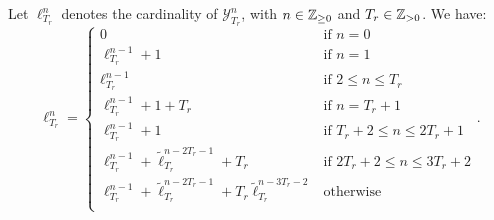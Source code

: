 \documentclass{article}
\begin{document}

      \begin{theorem} \label{thm:2-recursion}
        Let $\ell_{T_r}^n$ denotes the cardinality of $\mathcal{Y}_{T_r}^n$, with $n \in \mathbb{Z}_{\geq 0}$ and $T_r \in \mathbb{Z}_{> 0}$. We have:
        \begin{equation}
          \ell_{T_r}^{n} = 
          \left\{
            \begin{array}{ll}
              0 & \mbox{if } n = 0 \\
              \ell_{T_r}^{n-1} + 1 & \mbox{if } n = 1 \\
              \ell_{T_r}^{n-1} & \mbox{if } 2 \leq n \leq T_r \\
              \ell_{T_r}^{n-1} + 1 + T_r & \mbox{if } n = T_r + 1 \\
              \ell_{T_r}^{n-1} + 1 & \mbox{if } T_r + 2 \leq n \leq 2T_r + 1 \\
              \ell_{T_r}^{n-1} + \tilde{\ell}_{T_r}^{n-2T_r-1} + T_r & \mbox{if } 2T_r + 2 \leq n \leq 3T_r + 2 \\
              \ell_{T_r}^{n-1} + \tilde{\ell}_{T_r}^{n-2T_r-1} + T_r \tilde{\ell}_{T_r}^{n-3T_r-2} & \mbox{otherwise} \\
            \end{array}
          \right..
        \end{equation}
      \end{theorem}
      
\end{document}
